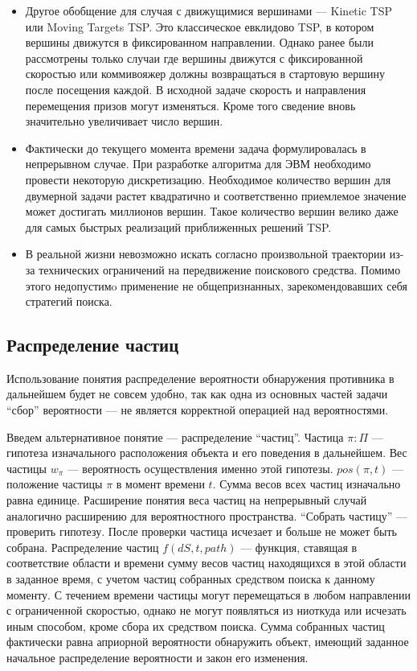 \begin{itemize}
{в том, что значительно увеличивается количество вершин, в частности новая вершина будет
сопоставлена $j$-му моменту, когда приз $q_i$ оказался в вершине $v$.} 
\item{Другое обобщение для случая с движущимися вершинами --- Kinetic TSP или Moving Targets TSP.
Это классическое евклидово TSP, в котором вершины движутся в фиксированном направлении.
Однако ранее были рассмотрены только случаи где вершины движутся с фиксированной скоростью или
коммивояжер должны возвращаться в стартовую вершину после посещения каждой. В исходной
задаче скорость и направления перемещения призов могут изменяться. Кроме того сведение вновь
значительно увеличивает число вершин.}
\item{Фактически до текущего момента времени задача формулировалась в непрерывном случае.
При разработке алгоритма для ЭВМ необходимо провести некоторую дискретизацию.
Необходимое количество вершин для двумерной задачи растет квадратично и соответственно
приемлемое значение может достигать миллионов вершин. Такое количество вершин велико
даже для самых быстрых реализаций приближенных решений TSP.}
\item{В реальной жизни невозможно искать согласно произвольной траектории из-за технических
ограничений на передвижение поискового средства. Помимо этого недопустимo применение не
общепризнанных, зарекомендовавших себя стратегий поиска.}
\end{itemize}

\FloatBarrier
\subsection{Распределение частиц}
Использование понятия распределение вероятности обнаружения противника в дальнейшем будет
не совсем удобно, так как одна из основных частей задачи ``сбор'' вероятности --- не является
корректной операцией над вероятностями.

Введем альтернативное понятие --- распределение ``частиц''.
Частица $\pi : \Pi$ --- гипотеза изначального расположения объекта и его поведения в дальнейшем.
Вес частицы $w_{\pi}$ --- вероятность осуществления именно этой гипотезы.
$pos(\pi, t)$ --- положение частицы $\pi$ в момент времени $t$.
Сумма весов всех частиц изначально равна единице. Расширение понятия веса частиц на непрерывный
 случай аналогично расширению для вероятностного пространства.
``Собрать частицу'' --- проверить гипотезу. После проверки частица исчезает и больше не может
быть собрана.
Распределение частиц $f(dS, t, path)$ --- функция, ставящая в соответствие области и
 времени сумму весов частиц находящихся в этой области в заданное время,
 с учетом частиц собранных средством поиска к данному моменту. 
С течением времени частицы могут перемещаться в любом направлении с ограниченной скоростью, однако
не могут появляться из ниоткуда или исчезать иным способом, кроме сбора их средством поиска.
Сумма собранных частиц фактически равна априорной вероятности обнаружить объект, имеющий заданное
начальное распределение вероятности и закон его изменения.

